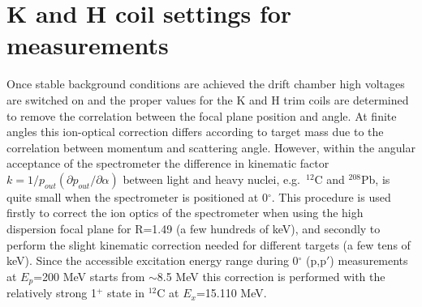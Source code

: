 \documentclass[11pt]{report}
\begin{document}





\clearpage


\section{K and H coil settings for measurements}\label{sec:khcoil0degr}

Once stable background conditions are achieved the drift chamber high voltages are switched on 
and the proper values for the K and H trim coils are determined to 
remove the correlation between the focal plane position and angle.
%
At finite angles this ion-optical correction differs according to target mass
due to the correlation between momentum and scattering angle.
%
However, 
within the angular acceptance of the spectrometer %
the difference in kinematic factor $k = 1/p_{out}(\partial p_{out}/ \partial \alpha)$
between light and heavy nuclei, e.g.~$^{12}$C and $^{208}$Pb,
is quite small when the spectrometer is positioned at 0$^{\circ}$.
%
This procedure is used firstly to correct the ion optics of the spectrometer when using the 
high dispersion focal plane for R=1.49 (a few hundreds of keV), 
and secondly to perform the slight kinematic correction needed for different targets (a few tens of keV).
%
Since the accessible excitation energy range during  0$^{\circ}$ (p,p$'$) measurements at $E_p$=200 MeV 
starts from $\sim$8.5 MeV this correction is performed with the relatively strong 1$^+$ state in $^{12}$C  
at $E_x$=15.110 MeV.
\end{document}
